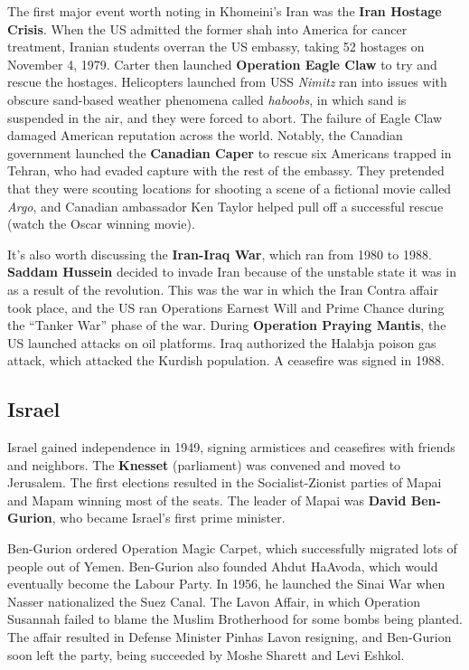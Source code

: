 The first major event worth noting in Khomeini's Iran was the \textbf{Iran Hostage Crisis}.
When the US admitted the former shah into America for cancer treatment,
Iranian students overran the US embassy, taking 52 hostages on November 4, 1979.
Carter then launched \textbf{Operation Eagle Claw} to try and rescue the hostages.
Helicopters launched from USS \textit{Nimitz} ran into issues
with obscure sand-based weather phenomena called \textit{haboobs},
in which sand is suspended in the air, and they were forced to abort.
The failure of Eagle Claw damaged American reputation across the world.
Notably, the Canadian government launched the \textbf{Canadian Caper} to rescue six Americans trapped in Tehran,
who had evaded capture with the rest of the embassy.
They pretended that they were scouting locations for shooting a scene of a fictional movie called \textit{Argo},
and Canadian ambassador Ken Taylor helped pull off a successful rescue (watch the Oscar winning movie).

It's also worth discussing the \textbf{Iran-Iraq War}, which ran from 1980 to 1988.
\textbf{Saddam Hussein} decided to invade Iran because of the unstable state it was in as a result of the revolution.
This was the war in which the Iran Contra affair took place,
and the US ran Operations Earnest Will and Prime Chance during the ``Tanker War'' phase of the war.
During \textbf{Operation Praying Mantis}, the US launched attacks on oil platforms.
Iraq authorized the Halabja poison gas attack, which attacked the Kurdish population.
A ceasefire was signed in 1988.

\subsection*{Israel}

Israel gained independence in 1949, signing armistices and ceasefires with friends and neighbors.
The \textbf{Knesset} (parliament) was convened and moved to Jerusalem.
The first elections resulted in the Socialist-Zionist parties of Mapai and Mapam winning most of the seats.
The leader of Mapai was \textbf{David Ben-Gurion}, who became Israel's first prime minister.

Ben-Gurion ordered Operation Magic Carpet, which successfully migrated lots of people out of Yemen.
Ben-Gurion also founded Ahdut HaAvoda, which would eventually become the Labour Party.
In 1956, he launched the Sinai War when Nasser nationalized the Suez Canal.
The Lavon Affair, in which Operation Susannah failed to blame the Muslim Brotherhood for some bombs being planted.
The affair resulted in Defense Minister Pinhas Lavon resigning,
and Ben-Gurion soon left the party, being succeeded by Moshe Sharett and Levi Eshkol.


